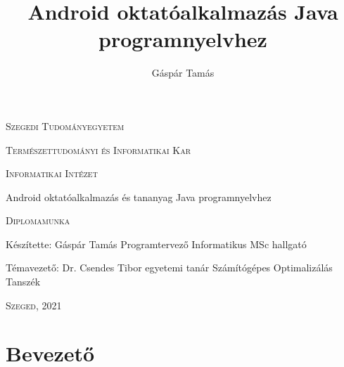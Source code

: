 \documentclass[12pt,a4paper]{article}
\title{Android oktatóalkalmazás Java programnyelvhez}
\author{Gáspár Tamás}
\begin{document}
	
	
	\thispagestyle{empty}
	\centerline{\textsc{\Large{Szegedi Tudományegyetem}}}
	\vspace{0.3 cm}
	\centerline{\textsc{\Large{Természettudományi és Informatikai Kar}}}
	
	\vspace*{2 cm}
	
	\centerline{\textsc{\Large{Informatikai Intézet}}}
	\vspace{3 cm}
	
	\centerline{\LARGE{Android oktatóalkalmazás és tananyag Java programnyelvhez}}
	\vspace{0.5 cm}
	\centerline{\Large{\textsc{Diplomamunka}}}
	
	\vspace{3 cm}
	
	\begin{flushleft}
		Készítette: Gáspár Tamás \newline
		Programtervező Informatikus MSc hallgató
	\end{flushleft}

	\vspace{1 cm}

	\begin{flushright}
		\hspace*{\fill} Témavezető: Dr. Csendes Tibor \newline
		\hspace*{\fill} egyetemi tanár \newline
		\hspace*{\fill} Számítógépes Optimalizálás Tanszék 
	\end{flushright}
	
	\vspace{3 cm}
	
	\centerline{\Large{\textsc{Szeged, 2021}}}
	
	\newpage
	\thispagestyle{empty}
	
	\tableofcontents
	
	\newpage
	\setcounter{page}{1}
	\fontsize{12}{16}\selectfont
	
	\section{Bevezető}
\end{document}
